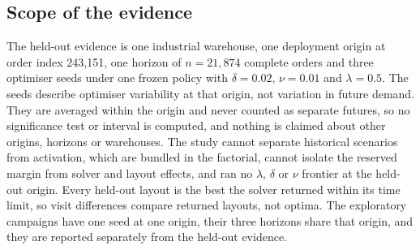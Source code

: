 \subsection{Scope of the evidence}\label{subsec:scope}
The held-out evidence is one industrial warehouse, one deployment origin at order index 243,151, one horizon of $n=21{,}874$ complete orders and three optimiser seeds under one frozen policy with $\delta=0.02$, $\nu=0.01$ and $\lambda=0.5$. The seeds describe optimiser variability at that origin, not variation in future demand. They are averaged within the origin and never counted as separate futures, so no significance test or interval is computed, and nothing is claimed about other origins, horizons or warehouses. The study cannot separate historical scenarios from activation, which are bundled in the factorial, cannot isolate the reserved margin from solver and layout effects, and ran no $\lambda$, $\delta$ or $\nu$ frontier at the held-out origin. Every held-out layout is the best the solver returned within its time limit, so visit differences compare returned layouts, not optima. The exploratory campaigns have one seed at one origin, their three horizons share that origin, and they are reported separately from the held-out evidence.
